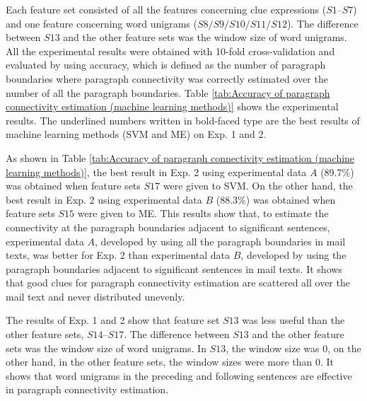 \documentclass[english]{jnlp_1.4}
\begin{document}
Each feature set consisted of all the features concerning clue expressions ($S1$--$S7$)
and one feature concerning word unigrams ($S8/S9/S10/S11/S12$).
The difference between $S13$ and the other feature sets was
the window size of word unigrams.
All the experimental results were obtained with 10-fold cross-validation and 
evaluated by using accuracy, 
which is defined as the number of paragraph boundaries 
where paragraph connectivity was correctly estimated 
over the number of all the paragraph boundaries.
Table \ref{tab:Accuracy of paragraph connectivity estimation (machine learning methods)} shows
the experimental results. 
The underlined numbers written in bold-faced type are
the best results of machine learning methods (SVM and ME) on Exp. 1 and 2.



\begin{table}[b]
 \label{tab:Accuracy of paragraph connectivity estimation (machine learning methods)}

\end{table}

As shown in 
Table \ref{tab:Accuracy of paragraph connectivity estimation (machine learning methods)},
the best result in Exp. 2 using experimental data $A$ (89.7\%) 
was obtained when feature sets $S17$ were given to SVM.  
On the other hand, 
the best result in Exp. 2 using experimental data $B$ (88.3\%) 
was obtained when feature sets $S15$ were given to ME. 
This results show that,
to estimate the connectivity at the paragraph boundaries 
adjacent to significant sentences, 
experimental data $A$, developed by using all the paragraph boundaries in mail texts, 
was better for Exp. 2
than experimental data $B$, 
developed by using the paragraph boundaries adjacent to significant sentences in mail texts. 
It shows that 
good clues for paragraph connectivity estimation are scattered all over the mail text 
and never distributed unevenly. 


The results of Exp. 1 and 2 show that
feature set $S13$ was less useful than the other feature sets, $S14$--$S17$.
The difference between $S13$ and the other feature sets was
the window size of word unigrams.
In $S13$, the window size was 0, 
on the other hand, 
in the other feature sets, 
the window sizes were more than 0.
It shows that 
word unigrams in the preceding and following sentences are effective 
in paragraph connectivity estimation.
\end{document}
